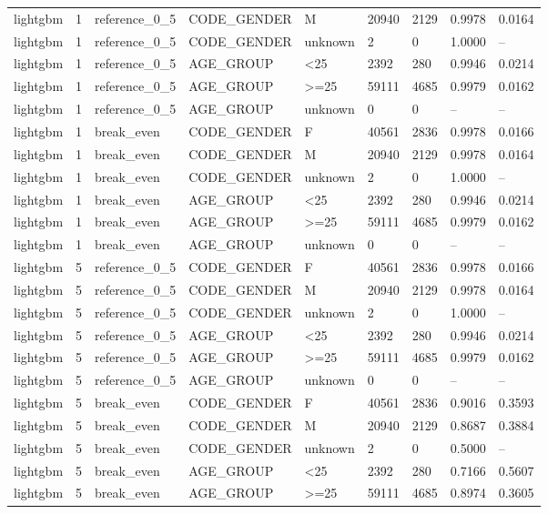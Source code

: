 \begin{longtable}{lllllllll}
lightgbm & 1 & reference\_0\_5 & CODE\_GENDER & M & 20940 & 2129 & 0.9978 & 0.0164 \\
lightgbm & 1 & reference\_0\_5 & CODE\_GENDER & unknown & 2 & 0 & 1.0000 & -- \\
lightgbm & 1 & reference\_0\_5 & AGE\_GROUP & <25 & 2392 & 280 & 0.9946 & 0.0214 \\
lightgbm & 1 & reference\_0\_5 & AGE\_GROUP & >=25 & 59111 & 4685 & 0.9979 & 0.0162 \\
lightgbm & 1 & reference\_0\_5 & AGE\_GROUP & unknown & 0 & 0 & -- & -- \\
lightgbm & 1 & break\_even & CODE\_GENDER & F & 40561 & 2836 & 0.9978 & 0.0166 \\
lightgbm & 1 & break\_even & CODE\_GENDER & M & 20940 & 2129 & 0.9978 & 0.0164 \\
lightgbm & 1 & break\_even & CODE\_GENDER & unknown & 2 & 0 & 1.0000 & -- \\
lightgbm & 1 & break\_even & AGE\_GROUP & <25 & 2392 & 280 & 0.9946 & 0.0214 \\
lightgbm & 1 & break\_even & AGE\_GROUP & >=25 & 59111 & 4685 & 0.9979 & 0.0162 \\
lightgbm & 1 & break\_even & AGE\_GROUP & unknown & 0 & 0 & -- & -- \\
lightgbm & 5 & reference\_0\_5 & CODE\_GENDER & F & 40561 & 2836 & 0.9978 & 0.0166 \\
lightgbm & 5 & reference\_0\_5 & CODE\_GENDER & M & 20940 & 2129 & 0.9978 & 0.0164 \\
lightgbm & 5 & reference\_0\_5 & CODE\_GENDER & unknown & 2 & 0 & 1.0000 & -- \\
lightgbm & 5 & reference\_0\_5 & AGE\_GROUP & <25 & 2392 & 280 & 0.9946 & 0.0214 \\
lightgbm & 5 & reference\_0\_5 & AGE\_GROUP & >=25 & 59111 & 4685 & 0.9979 & 0.0162 \\
lightgbm & 5 & reference\_0\_5 & AGE\_GROUP & unknown & 0 & 0 & -- & -- \\
lightgbm & 5 & break\_even & CODE\_GENDER & F & 40561 & 2836 & 0.9016 & 0.3593 \\
lightgbm & 5 & break\_even & CODE\_GENDER & M & 20940 & 2129 & 0.8687 & 0.3884 \\
lightgbm & 5 & break\_even & CODE\_GENDER & unknown & 2 & 0 & 0.5000 & -- \\
lightgbm & 5 & break\_even & AGE\_GROUP & <25 & 2392 & 280 & 0.7166 & 0.5607 \\
lightgbm & 5 & break\_even & AGE\_GROUP & >=25 & 59111 & 4685 & 0.8974 & 0.3605 \\

\end{longtable}
